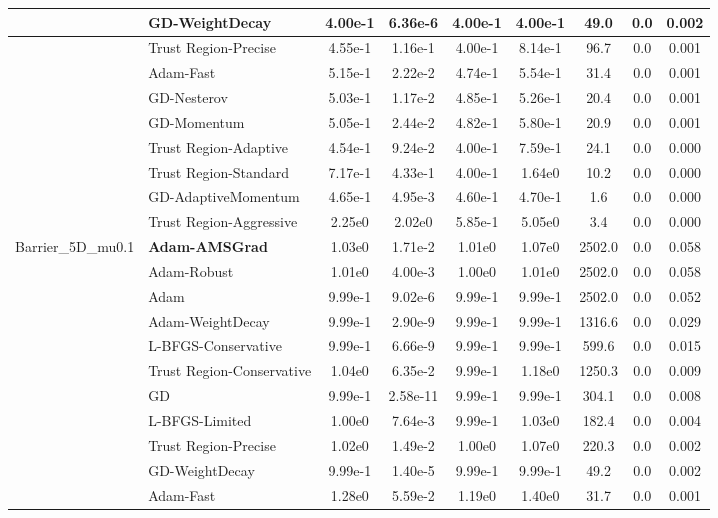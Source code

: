 \documentclass[10pt]{article}
\begin{document}
\begin{longtable}{|l|l|c|c|c|c|c|c|c|}
\hline
 & GD-WeightDecay & 4.00e-1 & 6.36e-6 & 4.00e-1 & 4.00e-1 & 49.0 & 0.0 & 0.002 \\
\hline
 & Trust Region-Precise & 4.55e-1 & 1.16e-1 & 4.00e-1 & 8.14e-1 & 96.7 & 0.0 & 0.001 \\
\hline
 & Adam-Fast & 5.15e-1 & 2.22e-2 & 4.74e-1 & 5.54e-1 & 31.4 & 0.0 & 0.001 \\
\hline
 & GD-Nesterov & 5.03e-1 & 1.17e-2 & 4.85e-1 & 5.26e-1 & 20.4 & 0.0 & 0.001 \\
\hline
 & GD-Momentum & 5.05e-1 & 2.44e-2 & 4.82e-1 & 5.80e-1 & 20.9 & 0.0 & 0.001 \\
\hline
 & Trust Region-Adaptive & 4.54e-1 & 9.24e-2 & 4.00e-1 & 7.59e-1 & 24.1 & 0.0 & 0.000 \\
\hline
 & Trust Region-Standard & 7.17e-1 & 4.33e-1 & 4.00e-1 & 1.64e0 & 10.2 & 0.0 & 0.000 \\
\hline
 & GD-AdaptiveMomentum & 4.65e-1 & 4.95e-3 & 4.60e-1 & 4.70e-1 & 1.6 & 0.0 & 0.000 \\
\hline
 & Trust Region-Aggressive & 2.25e0 & 2.02e0 & 5.85e-1 & 5.05e0 & 3.4 & 0.0 & 0.000 \\
Barrier\_5D\_mu0.1 & \textbf{Adam-AMSGrad} & 1.03e0 & 1.71e-2 & 1.01e0 & 1.07e0 & 2502.0 & 0.0 & 0.058 \\
\hline
 & Adam-Robust & 1.01e0 & 4.00e-3 & 1.00e0 & 1.01e0 & 2502.0 & 0.0 & 0.058 \\
\hline
 & Adam & 9.99e-1 & 9.02e-6 & 9.99e-1 & 9.99e-1 & 2502.0 & 0.0 & 0.052 \\
\hline
 & Adam-WeightDecay & 9.99e-1 & 2.90e-9 & 9.99e-1 & 9.99e-1 & 1316.6 & 0.0 & 0.029 \\
\hline
 & L-BFGS-Conservative & 9.99e-1 & 6.66e-9 & 9.99e-1 & 9.99e-1 & 599.6 & 0.0 & 0.015 \\
\hline
 & Trust Region-Conservative & 1.04e0 & 6.35e-2 & 9.99e-1 & 1.18e0 & 1250.3 & 0.0 & 0.009 \\
\hline
 & GD & 9.99e-1 & 2.58e-11 & 9.99e-1 & 9.99e-1 & 304.1 & 0.0 & 0.008 \\
\hline
 & L-BFGS-Limited & 1.00e0 & 7.64e-3 & 9.99e-1 & 1.03e0 & 182.4 & 0.0 & 0.004 \\
\hline
 & Trust Region-Precise & 1.02e0 & 1.49e-2 & 1.00e0 & 1.07e0 & 220.3 & 0.0 & 0.002 \\
\hline
 & GD-WeightDecay & 9.99e-1 & 1.40e-5 & 9.99e-1 & 9.99e-1 & 49.2 & 0.0 & 0.002 \\
\hline
 & Adam-Fast & 1.28e0 & 5.59e-2 & 1.19e0 & 1.40e0 & 31.7 & 0.0 & 0.001 \\

\end{longtable}
\end{document}
